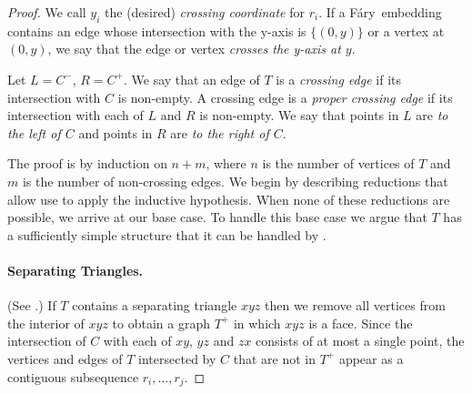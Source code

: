 \documentclass{patmorin}
\newcommand{\Fary}{Fáry}
\begin{document}
\begin{proof}
   We call $y_i$ the (desired) \emph{crossing coordinate} for $r_i$. If
   a \Fary\ embedding contains an edge whose intersection with the
   y-axis is $\{(0,y)\}$ or a vertex at $(0,y)$, we say that the edge
   or vertex \emph{crosses the y-axis at $y$}.

   Let $L=C^-$, $R=C^+$.  We say that an edge of $T$ is a \emph{crossing
   edge} if its intersection with $C$ is non-empty.  A crossing edge is
   a \emph{proper crossing edge} if its intersection with each of $L$
   and $R$ is non-empty.  We say that points in $L$ are \emph{to the
   left of $C$} and points in $R$ are \emph{to the right of $C$}.


%

   The proof is by induction on $n+m$, where $n$ is the number of
   vertices of $T$ and $m$ is the number of non-crossing edges.  We begin
   by describing reductions that allow use to apply the inductive
   hypothesis. When none of these reductions are possible, we arrive
   at our base case. To handle this base case we argue that $T$ has a
   sufficiently simple structure that it can be handled by .

   \paragraph{Separating Triangles.}
   (See .)
   If $T$ contains a separating triangle
   $xyz$ then we remove all vertices from the interior of $xyz$ to obtain
   a graph $T^+$ in which $xyz$ is a face.  Since the intersection of $C$
   with each of $xy$, $yz$ and $zx$ consists of at most a single point,
   the vertices and edges of $T$ intersected by $C$ that are not in $T^+$
   appear as a contiguous subsequence $r_i,\ldots,r_j$.


\end{proof}
\end{document}
